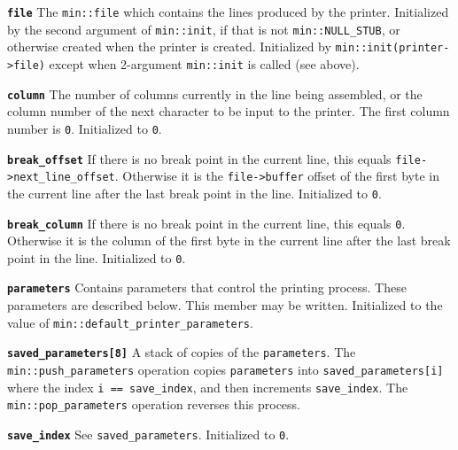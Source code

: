 \documentclass[12pt]{article}
\makeatletter
\newcommand{\ttmkey}[2]{{\tt \bf #1}\index{#1@{\tt #1}!#2}}
\newcommand{\EOL}{\penalty \exhyphenpenalty}
\newenvironment{itemlist}[1][1.2in]%
	{\begin{list}{}{\setlength{\labelwidth}{#1}%
		        \setlength{\leftmargin}{\labelwidth}%
		        \addtolength{\leftmargin}{+0.2in}%
		        \renewcommand{\makelabel}[1]{##1\hfill}}}%
	{\end{list}}
\makeatother
\begin{document}
\begin{itemlist}[0.8in]

\item[\ttmkey{file}{in {\tt min::printer}}]
The {\tt min::file} which contains the lines produced by the printer.
Initialized by the second argument of {\tt min::\EOL init}, if that is
not {\tt min::\EOL NULL\_\EOL STUB}, or otherwise created when the
printer is created.  Initialized by {\tt min::\EOL init(printer->\EOL file)}
except when 2-argument {\tt min::init} is called (see above).

\item[\ttmkey{column}{in {\tt min::printer}}]
The number of columns currently in the line being assembled,
or the column number of the next character to be input to the
printer.  The first column number is {\tt 0}.  Initialized to {\tt 0}.

\end{itemlist}

\begin{itemlist}[1.2in]

\item[\ttmkey{break\_\EOL offset}{in {\tt min::printer}}]
If there is no break point in the current line, this equals
{\tt file->\EOL next\_\EOL line\_\EOL offset}.
Otherwise it is the {\tt file->buffer} offset of the
first byte in the current line after the last break point in the line.
Initialized to {\tt 0}.

\item[\ttmkey{break\_\EOL column}{in {\tt min::printer}}]
If there is no break point in the current line, this equals {\tt 0}.
Otherwise it is the column of the
first byte in the current line after the last break point in the line.
Initialized to {\tt 0}.

\end{itemlist}

\begin{itemlist}[1.6in]

\item[\ttmkey{parameters}{in {\tt min::printer}}]
Contains parameters that control the printing process.
These parameters are described below.
This member may be written.
Initialized to the value of
{\tt min::\EOL default\_\EOL printer\_\EOL parameters}.

\item[\ttmkey{saved\_\EOL parameters[8]}{in {\tt min::printer}}]
A stack of copies of the {\tt parameters}.
The {\tt min::push\_\EOL parameters} operation copies
{\tt parameters} into {\tt saved\_\EOL parameters[i]} where
the index {\tt i~== save\_\EOL index}, and then
increments {\tt save\_\EOL index}.
The {\tt min::pop\_\EOL parameters} operation reverses this process.

\item[\ttmkey{save\_\EOL index}{in {\tt min::printer}}]
See {\tt saved\_parameters}.  Initialized to {\tt 0}.

\end{itemlist}
\end{document}
